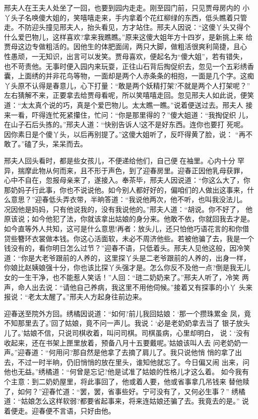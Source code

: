 邢夫人在王夫人处坐了一回，也要到园内走走。刚至园门前，只见贾母房内的
小丫头子名唤傻大姐的，笑嘻嘻走来，手内拿着个花红柳绿的东西，低头瞧着只管
走。不防迎头撞见邢夫人，抬头看见，方才站住。邢夫人因说：“这傻丫头又得个
什么爱巴物儿，这样喜欢?拿来我瞧瞧。”原来这傻大姐年方十四岁，是新挑上来
给贾母这边专做粗活的。因他生的体肥面阔，两只大脚，做粗活很爽利简捷，且心
性愚顽，一无知识，出言可以发笑。贾母喜欢，便起名为“傻大姐”，若有错失，
也不苛责他。无事时便入园内来玩耍，正往山石背后掏促织去，忽见一个五彩绣香
囊，上面绣的并非花鸟等物，一面却是两个人赤条条的相抱，一面是几个字。这痴
丫头原不认得是春意儿，心下打量：“敢是两个妖精打架?不就是两个人打架呢？”
左右猜解不来，正要拿去给贾母看呢，所以笑嘻嘻走回。忽见邢夫人如此说，便笑
道：“太太真个说的巧，真是个爱巴物儿。太太瞧一瞧。”说着便送过去。邢夫人
接来一看，吓得连忙死紧攥住，忙问：“你是那里得的？”傻大姐道：“我掏促织
儿，在山子石后头拣的。”邢夫人道：“快别告诉人!这不是好东西。连你也要打
死呢。因你素日是个傻丫头，以后再别提了。”这傻大姐听了，反吓得黄了脸，说：
“再不敢了。”磕了头，呆呆而去。

邢夫人回头看时，都是些女孩儿，不便递给他们，自己便在袖里。心内十分
罕异，揣摩此物从何而来，且不形于声色，到了迎春房里。迎春正因他乳母获罪，
心中不自在，忽报母亲来了，遂接入。奉茶毕，邢夫人因说道：“你这么大了，你
那奶妈子行此事，你也不说说他。如今别人都好好的，偏咱们的人做出这事来，什
么意思？”迎春低头弄衣带，半晌答道：“我说他两次，他不听，也叫我没法儿。
况因他是妈妈，只有他说我的，没有我说他的。”邢夫人道：“胡说。你不好了，
他原该说；如今他犯了法，你就该拿出姑娘的身分来。他敢不依，你就回我去才是。
如今直等外人共知，这可是什么意思!再者：放头儿，还只怕他巧语花言的和你借
贷些簪环衣裳做本钱。你这心活面软，未必不周济他些。若被他骗了去，我是一个
钱没有的，看你明日怎么过节？”迎春不语，只低着头。邢夫人见他这般，因冷笑
道：“你是大老爷跟前的人养的，这里探丫头是二老爷跟前的人养的，出身一样，
你娘比赵姨娘强十分，你也该比探丫头强才是。怎么你反不及他一点?倒是我无儿
女的一生干净，也不能惹人笑话！”人回：“琏二奶奶来了。”邢夫人听了，冷笑
两声，命人出去说：“请他自己养病，我这里不用他伺候。”接着又有探事的小丫
头来报说：“老太太醒了。”邢夫人方起身往前边来。

迎春送至院外方回。绣橘因说道：“如何?前儿我回姑娘：‘那一个攒珠累金
凤，竟不知那里去了。’回了姑娘，竟不问一声儿。我说：‘必是老奶奶拿去当了
银子放头儿了。’姑娘不信，只说司棋收着，叫问司棋。司棋虽病，心里却明白，
说：‘没有收起来，还在书架上匣里放着，预备八月十五要戴呢。’姑娘该叫人去
问老奶奶一声。”迎春道：“何用问?那自然是他拿了去摘了肩儿了。我只说他悄
悄的拿了出去，不过一时半晌，仍旧悄悄的放在里头，谁知他就忘了。今日偏又闹
出来，问他也无益。”绣橘道：“何曾是忘记?他是试准了姑娘的性格儿才这么着。
如今我有个主意：到二奶奶屋里，将此事回了，他或着人要，他或省事拿几吊钱来
替他赎了，如何？”迎春忙道：“罢，罢，省事些好。宁可没有了，又何必生事？”
绣橘道：“姑娘怎么这样软弱?都要省起事来，将来连姑娘还骗了去。我竟去的是。”
说着便走。迎春便不言语，只好由他。

